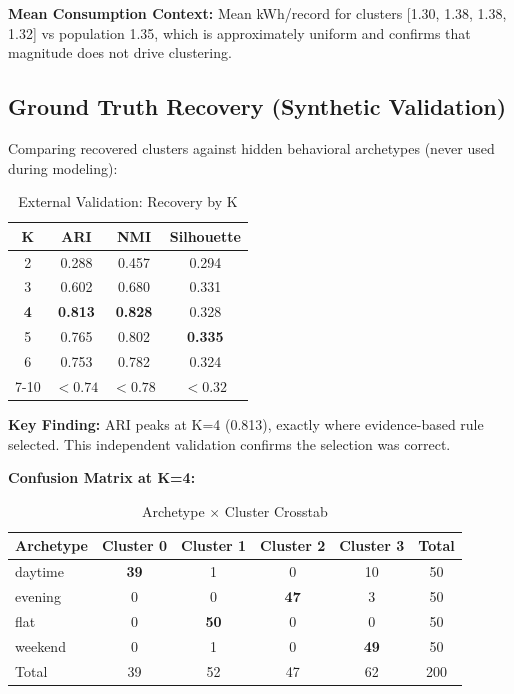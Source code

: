 \textbf{Mean Consumption Context:} Mean kWh/record for clusters [1.30, 1.38, 1.38, 1.32] vs population 1.35, which is approximately uniform and confirms that magnitude does not drive clustering.

\subsection{Ground Truth Recovery (Synthetic Validation)}

Comparing recovered clusters against hidden behavioral archetypes (never used during modeling):

\begin{table}[h]
\centering
\caption{External Validation: Recovery by K}
\label{tab:recovery_by_k}
\begin{tabular}{@{}cccc@{}}
\toprule
K & ARI & NMI & Silhouette \\
\midrule
2 & 0.288 & 0.457 & 0.294 \\
3 & 0.602 & 0.680 & 0.331 \\
\textbf{4} & \textbf{0.813} & \textbf{0.828} & 0.328 \\
5 & 0.765 & 0.802 & \textbf{0.335} \\
6 & 0.753 & 0.782 & 0.324 \\
7-10 & $<0.74$ & $<0.78$ & $<0.32$ \\
\bottomrule
\end{tabular}
\end{table}

\textbf{Key Finding:} ARI peaks at K=4 (0.813), exactly where evidence-based rule selected. This independent validation confirms the selection was correct.

\textbf{Confusion Matrix at K=4:}

\begin{table}[h]
\centering
\caption{Archetype $\times$ Cluster Crosstab}
\label{tab:crosstab}
\begin{tabular}{@{}lcccc|c@{}}
\toprule
Archetype & Cluster 0 & Cluster 1 & Cluster 2 & Cluster 3 & Total \\
\midrule
daytime & \textbf{39} & 1 & 0 & 10 & 50 \\
evening & 0 & 0 & \textbf{47} & 3 & 50 \\
flat & 0 & \textbf{50} & 0 & 0 & 50 \\
weekend & 0 & 1 & 0 & \textbf{49} & 50 \\
\midrule
Total & 39 & 52 & 47 & 62 & 200 \\
\bottomrule
\end{tabular}
\end{table}

